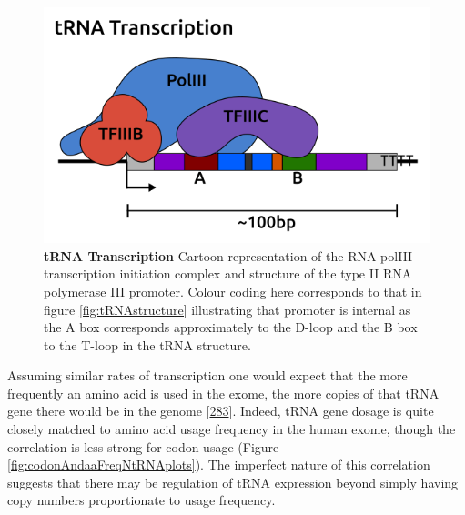 \documentclass[
]{book}
\begin{document}
\begin{figure}

{\centering \includegraphics[width=1\linewidth]{./figs/tRNA-PollIII_white} 

}

\caption{\textbf{tRNA Transcription} Cartoon representation of the RNA polIII transcription initiation complex and structure of the type II RNA polymerase III promoter. Colour coding here corresponds to that in figure \ref{fig:tRNAstructure} illustrating that promoter is internal as the A box corresponds approximately to the D-loop and the B box to the T-loop in the tRNA structure.}\label{fig:tRNApromoter}
\end{figure}



Assuming similar rates of transcription one would expect that the more frequently an amino acid is used in the exome, the more copies of that tRNA gene there would be in the genome {[}\protect\hyperlink{ref-Gingold2012}{283}{]}.
Indeed, tRNA gene dosage is quite closely matched to amino acid usage frequency in the human exome, though the correlation is less strong for codon usage (Figure \ref{fig:codonAndaaFreqNtRNAplots}).
The imperfect nature of this correlation suggests that there may be regulation of tRNA expression beyond simply having copy numbers proportionate to usage frequency.
\end{document}
